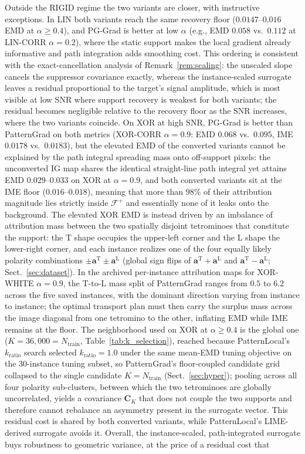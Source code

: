 \documentclass[pdflatex,sn-mathphys-num]{sn-jnl}
\theoremstyle{thmstyleone}
\theoremstyle{thmstyletwo}%
\theoremstyle{thmstylethree}%
\begin{document}
Outside the RIGID regime the two variants are closer, with instructive exceptions. In LIN both variants reach the same recovery floor ($0.0147$--$0.016$ EMD at $\alpha \ge 0.4$), and PG-Grad is better at low $\alpha$ (e.g., EMD $0.058$ vs.\ $0.112$ at LIN-CORR $\alpha = 0.2$), where the static support makes the local gradient already informative and path integration adds smoothing cost. This ordering is consistent with the exact-cancellation analysis of Remark~\ref{rem:scaling}: the unscaled slope cancels the suppressor covariance exactly, whereas the instance-scaled surrogate leaves a residual proportional to the target's signal amplitude, which is most visible at low SNR where support recovery is weakest for both variants; the residual becomes negligible relative to the recovery floor as the SNR increases, where the two variants coincide. On XOR at high SNR, PG-Grad is better than PatternGrad on both metrics (XOR-CORR $\alpha = 0.9$: EMD $0.068$ vs.\ $0.095$, IME $0.0178$ vs.\ $0.0183$), but the elevated EMD of the converted variants cannot be explained by the path integral spreading mass onto off-support pixels: the unconverted IG map shares the identical straight-line path integral yet attains EMD $0.029$--$0.033$ on XOR at $\alpha = 0.9$, and both converted variants sit at the IME floor ($0.016$--$0.018$), meaning that more than $98\%$ of their attribution magnitude lies strictly inside $\mathcal{F}^{+}$ and essentially none of it leaks onto the background. The elevated XOR EMD is instead driven by an imbalance of attribution mass between the two spatially disjoint tetrominoes that constitute the support: the T shape occupies the upper-left corner and the L shape the lower-right corner, and each instance realizes one of the four equally likely polarity combinations $\pm\mathbf{a}^{\text{T}} \pm \mathbf{a}^{\text{L}}$ (global sign flips of $\mathbf{a}^{\text{T}} + \mathbf{a}^{\text{L}}$ and $\mathbf{a}^{\text{T}} - \mathbf{a}^{\text{L}}$; Sect.~\ref{sec:dataset}). In the archived per-instance attribution maps for XOR-WHITE $\alpha = 0.9$, the T-to-L mass split of PatternGrad ranges from $0.5$ to $6.2$ across the five saved instances, with the dominant direction varying from instance to instance; the optimal transport plan must then carry the surplus mass across the image diagonal from one tetromino to the other, inflating EMD while IME remains at the floor. The neighborhood used on XOR at $\alpha \ge 0.4$ is the global one ($K = 36{,}000 = N_{\text{train}}$, Table~\ref{tab:k_selection}), reached because PatternLocal's $k_{\text{ratio}}$ search selected $k_{\text{ratio}} = 1.0$ under the same mean-EMD tuning objective on the $30$-instance tuning subset, so PatternGrad's floor-coupled candidate grid collapsed to the single candidate $K = N_{\text{train}}$ (Sect.~\ref{sec:hyper}); pooling across all four polarity sub-clusters, between which the two tetrominoes are globally uncorrelated, yields a covariance $\mathbf{C}_K$ that does not couple the two supports and therefore cannot rebalance an asymmetry present in the surrogate vector. This residual cost is shared by both converted variants, while PatternLocal's LIME-derived surrogate avoids it. Overall, the instance-scaled, path-integrated surrogate buys robustness to geometric variance, at the price of a residual cost that 
\end{document}
